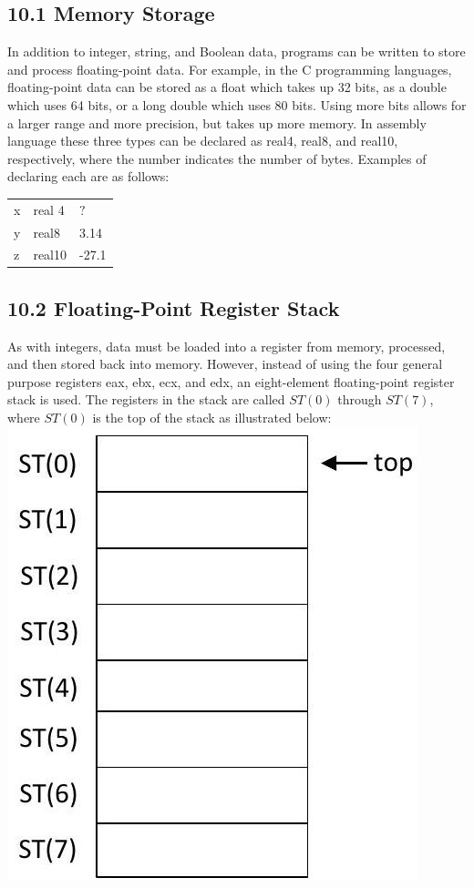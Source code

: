 \documentclass[10pt]{article}
\begin{document}
\subsection*{10.1 Memory Storage}
In addition to integer, string, and Boolean data, programs can be written to store and process floating-point data. For example, in the C programming languages, floating-point data can be stored as a float which takes up 32 bits, as a double which uses 64 bits, or a long double which uses 80 bits. Using more bits allows for a larger range and more precision, but takes up more memory. In assembly language these three types can be declared as real4, real8, and real10, respectively, where the number indicates the number of bytes. Examples of declaring each are as follows:

\begin{center}
\begin{tabular}{lll}
x & real 4 & $?$ \\
y & real8 & 3.14 \\
z & real10 & -27.1 \\
\end{tabular}
\end{center}

\subsection*{10.2 Floating-Point Register Stack}
As with integers, data must be loaded into a register from memory, processed, and then stored back into memory. However, instead of using the four general purpose registers eax, ebx, ecx, and edx, an eight-element floating-point register stack is used. The registers in the stack are called $S T(0)$ through $S T(7)$, where $S T(0)$ is the top of the stack as illustrated below:\\
\includegraphics[max width=\textwidth, center]{2025_03_24_ebe50cc223a6fbc49eecg-221}
\end{document}
